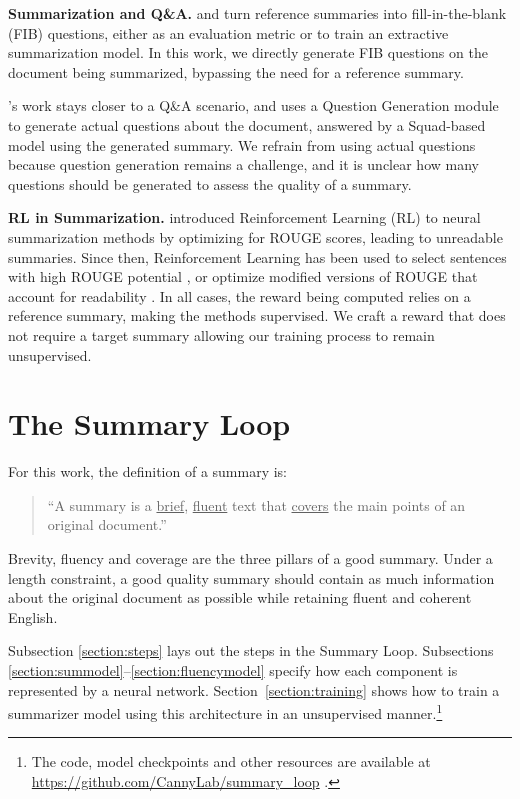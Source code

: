 \documentclass[11pt,a4paper]{article}
\begin{document}
\textbf{Summarization and Q\&A.} \citet{eyal2019question} and \citet{arumae2018reinforced} turn reference summaries into fill-in-the-blank (FIB) questions, either as an evaluation metric or to train an extractive summarization model. In this work, we directly generate FIB questions on the document being summarized, bypassing the need for a reference summary.

\citet{scialom2019answers}'s work stays closer to a Q\&A scenario, and uses a Question Generation module to generate actual questions about the document, answered by a  Squad-based \cite{rajpurkar2018know} model using the generated summary. We refrain from using actual questions because question generation remains a challenge, and it is unclear how many questions should be generated to assess the quality of a summary.

\textbf{RL in Summarization.} \citet{Paulus2018ADR} introduced Reinforcement Learning (RL) to neural summarization methods by optimizing for ROUGE scores, leading to unreadable summaries. Since then, Reinforcement Learning has been used to select sentences with high ROUGE potential \cite{chen2018fast}, or optimize modified versions of ROUGE that account for readability \cite{pasunuru2018multi}. In all cases, the reward being computed relies on a reference summary, making the methods supervised. We craft a reward that does not require a target summary allowing our training process to remain unsupervised.

\section{The Summary Loop}
\label{section:summary_loop}
For this work, the definition of a summary is:

\begin{quote}
    \centering
    ``A summary is a \underline{brief}, \underline{fluent} text that \underline{covers} the main points of an original document.''
\end{quote}

Brevity, fluency and coverage are the three pillars of a good summary. Under a length constraint, a good quality summary should contain as much information about the original document as possible while retaining fluent and coherent English. 

Subsection \ref{section:steps} lays out the steps in the Summary Loop. Subsections \ref{section:summodel}--\ref{section:fluencymodel}  specify how each component is represented by a neural network. Section~\ref{section:training} shows how to  train a summarizer model using this architecture in an unsupervised manner.\footnote{The code, model checkpoints and other resources are available at \url{https://github.com/CannyLab/summary_loop} .}
\end{document}
